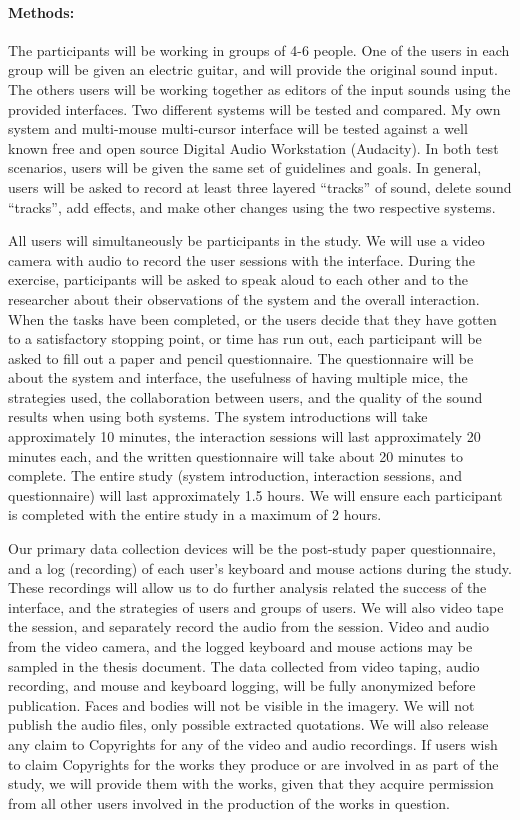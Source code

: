 \documentclass[10pt]{article}
\begin{document}
\paragraph{Methods:}
%
The participants will be working in groups of 4-6 people. One of the users 
in each group will be given an electric guitar, and will provide the original 
sound input. The others users will be working together as editors of the input 
sounds using the provided interfaces. Two different systems will be tested and 
compared. My own system and multi-mouse multi-cursor interface will be tested 
against a well known free and open source Digital Audio Workstation (Audacity).
In both test scenarios, users will be given the same set of guidelines and goals.
In general, users will be asked to record at least three layered ``tracks'' of 
sound, delete sound ``tracks'', add effects, and make other changes using the 
two respective systems.

All users will simultaneously be
participants in the study.  We will use a video camera with audio to
record the user sessions with the interface.
During the exercise, participants will be asked to speak aloud
to each other and to the researcher about their observations of the
system and the overall interaction. When the tasks have been completed, 
or the users decide that they have gotten to a satisfactory stopping point, 
or time has run out, each participant will be asked to fill out a paper and pencil
questionnaire. The questionnaire will be about the system and interface, 
the usefulness of having
multiple mice, the strategies used, the collaboration between users, 
and the quality of the sound results when using both systems. The system
introductions will take approximately 10 minutes, the interaction sessions will last
approximately 20 minutes each, and the written
questionnaire will take about 20 minutes to complete.  The entire
study (system introduction, interaction sessions, and questionnaire)
will last approximately 1.5 hours.  We will ensure each participant is
completed with the entire study in a maximum of 2 hours.

Our primary data collection devices will be the post-study paper
questionnaire, and a log (recording) of each user's keyboard and mouse actions during
the study. These recordings will allow us to do 
further analysis related the success of the interface, and the strategies of users 
and groups of users. We will also video tape the
session, and separately record the audio from the session.
Video and audio from the video camera, and the logged keyboard and mouse
actions may be sampled in the thesis document. The data collected from video taping, audio
recording, and mouse and keyboard logging, will be fully anonymized before publication.  
Faces and bodies will not be visible in the imagery. We will not publish the audio
files, only possible extracted quotations. We will also release any claim to Copyrights
for any of the video and audio recordings. If users wish to claim Copyrights for the 
works they produce or are involved in as part of the study, we will provide them with 
the works, given that they acquire permission from all other users involved in the 
production of the works in question.
\end{document}
